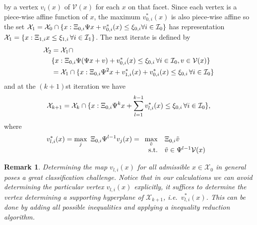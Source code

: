 \documentclass[letterpaper, 10pt, conference]{ieeeconf} %
\newtheorem{rem}[thm]{Remark}
\begin{document}
by a vertex $v_i(x)$ of $\mathcal V(x)$ for each $x$ on that facet.
Since each vertex is a piece-wise affine function of $x$, the maximum $v_{0,i}^\ast(x)$ is also piece-wise affine
so the set $\mathcal X_1=\mathcal X_0 \cap \{x:\Xi_{0,i}\Psi x + v_{0,i}^\ast(x) \leq 
\xi_{0,i}\forall i\in\mathcal I_0\}$
has representation $\mathcal X_1 = \{x:\Xi_{1,i}x\leq\xi_{1,i}\,\forall i\in\mathcal I_1\}$.
The next iterate is defined by
\begin{align*}
	\mathcal X_2 &= \mathcal X_1 \cap \\ &\{x:\Xi_{0,i}\Psi(\Psi x + v) + v_{0,i}^\ast(x)\leq\xi_{0,i}\,
	\forall i\in\mathcal I_0,v\in\mathcal V(x)\}\\
  &= \mathcal X_1 \cap \{x: \Xi_{0,i}\Psi^2 x + v_{1,i}^\ast(x) + v_{0,i}^\ast(x)\leq\xi_{0,i}\,\forall 
	i\in\mathcal I_0\}
\end{align*}
%
and at the $(k+1)$st iteration we have
%
\[
	\mathcal X_{k+1} = \mathcal X_k\cap \{x:\Xi_{0,i}\Psi^k x + \sum_{l=1}^{k-1}v_{l,i}^\ast(x)
	\leq\xi_{0,i}\,\forall i\in\mathcal I_0\},
\]
%
where 
%
\[
	v_{l,i}^\ast(x)=\max_j \ \genmat_{0,i}\Psi^{l-1}v_j(x)
   = \begin{array}[t]{rl} \displaystyle\max_{\tilde v} & \genmat_{0,i}\tilde v\\ \text{s.t.}& \tilde v\in 
   \Psi^{l-1}\mathcal V(x) \end{array}
\]
%
\begin{rem}
Determining the map $v_{l,i}(x)$ for all admissible $x\in \mathcal X_0$ in general poses a great classification
challenge. 
%
Notice that in our calculations we can avoid determining the particular vertex $v_{l,i}(x)$ explicitly, it
suffices to determine the vertex determining a supporting hyperplane of $\mathcal X_{k+1}$, i.e.~$v_{l,i}^\ast(x)$. 
%
This can be done by adding all possible inequalities and applying a inequality reduction algorithm.
\end{rem}
\end{document}

